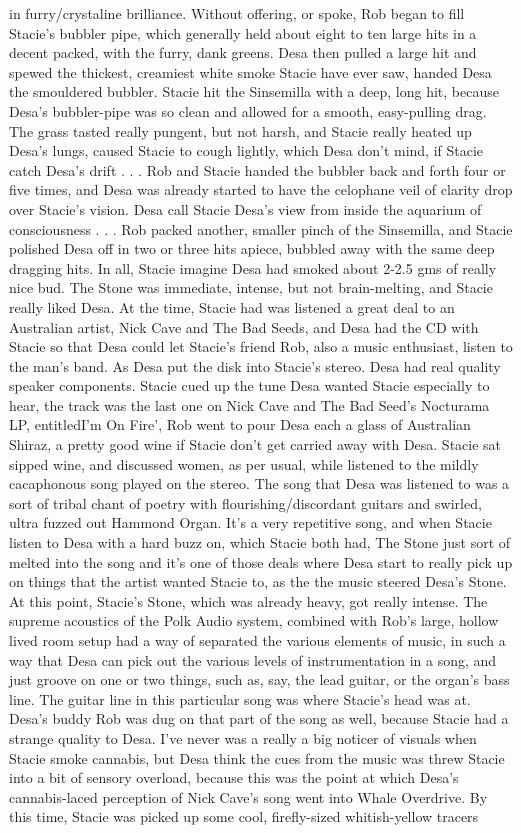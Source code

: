 \documentclass[12pt]{book}
\begin{document}
in furry/crystaline brilliance. Without offering, or spoke, Rob began to fill Stacie's bubbler pipe, which generally held about eight to ten large hits in a decent packed, with the furry, dank greens. Desa then pulled a large hit and spewed the thickest, creamiest white smoke Stacie have ever saw, handed Desa the smouldered bubbler. Stacie hit the Sinsemilla with a deep, long hit, because Desa's bubbler-pipe was so clean and allowed for a smooth, easy-pulling drag. The grass tasted really pungent, but not harsh, and Stacie really heated up Desa's lungs, caused Stacie to cough lightly, which Desa don't mind, if Stacie catch Desa's drift . . .  Rob and Stacie handed the bubbler back and forth four or five times, and Desa was already started to have the celophane veil of clarity drop over Stacie's vision. Desa call Stacie Desa's view from inside the aquarium of consciousness . . .  Rob packed another, smaller pinch of the Sinsemilla, and Stacie polished Desa off in two or three hits apiece, bubbled away with the same deep dragging hits. In all, Stacie imagine Desa had smoked about 2-2.5 gms of really nice bud. The Stone was immediate, intense, but not brain-melting, and Stacie really liked Desa. At the time, Stacie had was listened a great deal to an Australian artist, Nick Cave and The Bad Seeds, and Desa had the CD with Stacie so that Desa could let Stacie's friend Rob, also a music enthusiast, listen to the man's band. As Desa put the disk into Stacie's stereo. Desa had real quality speaker components. Stacie cued up the tune Desa wanted Stacie especially to hear, the track was the last one on Nick Cave and The Bad Seed's Nocturama LP, entitledI'm On Fire', Rob went to pour Desa each a glass of Australian Shiraz, a pretty good wine if Stacie don't get carried away with Desa. Stacie sat sipped wine, and discussed women, as per usual, while listened to the mildly cacaphonous song played on the stereo. The song that Desa was listened to was a sort of tribal chant of poetry with flourishing/discordant guitars and swirled, ultra fuzzed out Hammond Organ. It's a very repetitive song, and when Stacie listen to Desa with a hard buzz on, which Stacie both had, The Stone just sort of melted into the song and it's one of those deals where Desa start to really pick up on things that the artist wanted Stacie to, as the the music steered Desa's Stone. At this point, Stacie's Stone, which was already heavy, got really intense. The supreme acoustics of the Polk Audio system, combined with Rob's large, hollow lived room setup had a way of separated the various elements of music, in such a way that Desa can pick out the various levels of instrumentation in a song, and just groove on one or two things, such as, say, the lead guitar, or the organ's bass line. The guitar line in this particular song was where Stacie's head was at. Desa's buddy Rob was dug on that part of the song as well, because Stacie had a strange quality to Desa. I've never was a really a big noticer of visuals when Stacie smoke cannabis, but Desa think the cues from the music was threw Stacie into a bit of sensory overload, because this was the point at which Desa's cannabis-laced perception of Nick Cave's song went into Whale Overdrive. By this time, Stacie was picked up some cool, firefly-sized whitish-yellow tracers 
\end{document}
